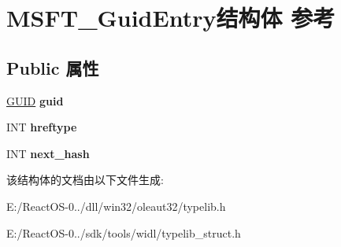 \hypertarget{struct_m_s_f_t___guid_entry}{}\section{M\+S\+F\+T\+\_\+\+Guid\+Entry结构体 参考}
\label{struct_m_s_f_t___guid_entry}
\subsection*{Public 属性}
\begin{DoxyCompactItemize}
\item 
\mbox{\label{struct_m_s_f_t___guid_entry_af128ab78293d457af55dfe54927dc350}} 
\hyperlink{interface_g_u_i_d}{G\+U\+ID} {\bfseries guid}
\item 
\mbox{\label{struct_m_s_f_t___guid_entry_ad824b2b33e422300b2c1f1c52469bde2}} 
I\+NT {\bfseries hreftype}
\item 
\mbox{\label{struct_m_s_f_t___guid_entry_a6c7b460b5c41c811406d9bf61a691a7a}} 
I\+NT {\bfseries next\+\_\+hash}
\end{DoxyCompactItemize}


该结构体的文档由以下文件生成\+:\begin{DoxyCompactItemize}
\item 
E\+:/\+React\+O\+S-\/0../dll/win32/oleaut32/typelib.\+h\item 
E\+:/\+React\+O\+S-\/0../sdk/tools/widl/typelib\+\_\+struct.\+h\end{DoxyCompactItemize}
